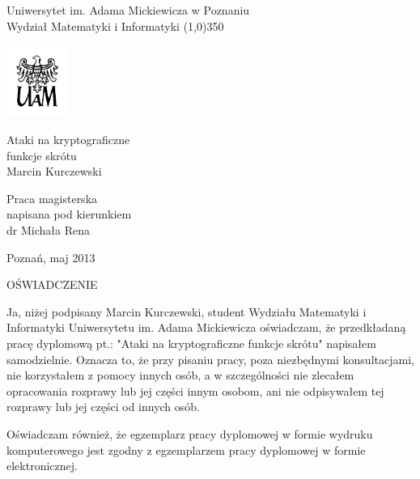 \documentclass[12pt,a4paper,twoside]{article}
\begin{document}
\onehalfspacing

\begin{titlepage}
	\begin{center}
	{\LARGE Uniwersytet im. Adama Mickiewicza w Poznaniu \\
	Wydział Matematyki i Informatyki }
	\line(1,0){350}

	\vspace{1cm}
	\includegraphics[width=2cm]{logo-uam/logo-uam.png}
	\vspace{1cm}

	\vspace{1cm}
	{\Huge Ataki na kryptograficzne \\ funkcje skrótu} \\[0.5cm]
	{\Large Marcin Kurczewski}
	\end{center}

	\vspace{3cm}
	\hspace{8cm}\parbox[l]{6cm}{\Large Praca magisterska \\
	napisana pod kierunkiem \\
	dr Michała Rena}

	\begin{center}
	\vspace{4cm}
	Poznań, maj 2013
	\end{center}

\end{titlepage}


\newpage
\thispagestyle{empty}
\begin{center}
	OŚWIADCZENIE
\end{center}

Ja, niżej podpisany Marcin Kurczewski, student Wydziału Matematyki i
Informatyki Uniwersytetu im. Adama Mickiewicza oświadczam, że przedkładaną
pracę dyplomową pt.: "Ataki na kryptograficzne funkcje skrótu" napisałem
samodzielnie.  Oznacza to, że przy pisaniu pracy, poza niezbędnymi
konsultacjami, nie korzystałem z pomocy innych osób, a w szczególności nie
zlecałem opracowania rozprawy lub jej części innym osobom, ani nie odpisywałem
tej rozprawy lub jej części od innych osób.

Oświadczam również, że egzemplarz pracy dyplomowej w formie wydruku
komputerowego jest zgodny z egzemplarzem pracy dyplomowej w formie
elektronicznej.
\end{document}
